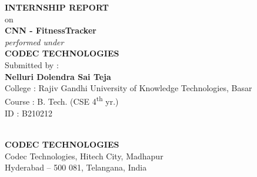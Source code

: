 \documentclass[12pt,a4paper]{report}
\begin{document}
\begin{titlepage}
\centering
\vspace*{0.5cm}
{\Large\bfseries INTERNSHIP REPORT} \\[0.3cm]
{\large on} \\[0.5cm]
{\Large\bfseries CNN - FitnessTracker} \\[1.5cm]

{\large\itshape performed under} \\[0.5cm]
{\Large\bfseries CODEC TECHNOLOGIES} \\[1.5cm]

{\large Submitted by :} \\[0.3cm]
{\large\bfseries Nelluri Dolendra Sai Teja} \\[0.15cm]
{\large College : Rajiv Gandhi University of Knowledge Technologies, Basar} \\[0.15cm]
{\large Course : B. Tech. (CSE 4\textsuperscript{th} yr.)} \\[0.15cm]
{\large ID : B210212} \\[1.5cm]

 \\[1.5cm]

{\large\bfseries CODEC TECHNOLOGIES} \\[0.15cm]
{\large Codec Technologies, Hitech City, Madhapur} \\[0.15cm]
{\large Hyderabad -- 500 081, Telangana, India}
\end{titlepage}
\end{document}
